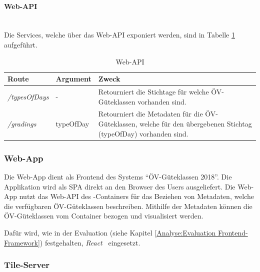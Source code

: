 \paragraph{Web-\ac{API}}~\\
Die Services, welche über das Web-\ac{API} exponiert werden, sind in Tabelle \ref{table:Wep-API} aufgeführt.

\begin{table}[H]
    \centering
    \begin{tabular}[c]{l l p{10.5cm}}
        \toprule
        \textbf{Route}          
                                & \textbf{Argument}
                                & \textbf{Zweck}\\
        \midrule
        \emph{/typesOfDays}
                                & -
                                & Retourniert die Stichtage für welche \gls{ÖV-Güteklassen} vorhanden sind.\\
        \emph{/gradings}        & typeOfDay
                                & Retourniert die Metadaten für die \gls{ÖV-Güteklassen}, welche für den übergebenen Stichtag (typeOfDay) vorhanden sind.\\
        \bottomrule
    \end{tabular}
    \caption{Web-\ac{API}}
    \label{table:Wep-API}
\end{table}


\subsubsection{Web-App}
\label{container:Web-App}

Die Web-App dient als Frontend des Systems "`\gls{ÖV-Güteklassen} 2018"'.
Die Applikation wird als \ac{SPA} direkt an den Browser des Users ausgeliefert.
Die Web-App nutzt das Web-\ac{API} des -Containers für das Beziehen von Metadaten, welche die verfügbaren ÖV-Güteklassen beschreiben.
Mithilfe der Metadaten können die ÖV-Güteklassen vom Container  bezogen und visualisiert werden.

Dafür wird, wie in der Evaluation (siehe Kapitel \ref{Analyse:Evaluation Frontend-Framework}) festgehalten, \emph{React}~\cite{react} eingesetzt.

\subsubsection{Tile-Server}
\label{container:Tile-Server}

